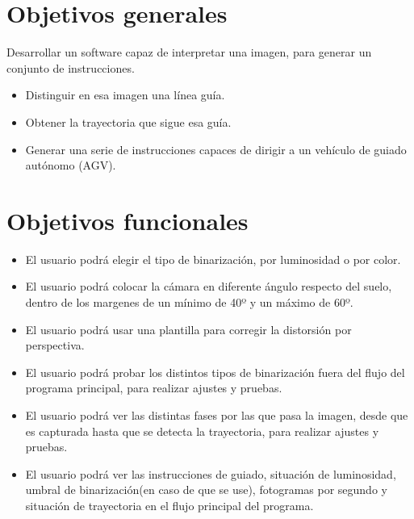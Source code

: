 
\section{Objetivos generales}
Desarrollar un software capaz de interpretar una imagen, para generar un conjunto de instrucciones.

\begin{itemize}
	\item Distinguir en esa imagen una línea guía.
	
	\item Obtener la trayectoria que sigue esa guía.
	
	\item Generar una serie de instrucciones capaces de dirigir a un vehículo de guiado autónomo (AGV).
\end{itemize} 

\section{Objetivos funcionales}
\begin{itemize}
	\item El usuario podrá elegir el tipo de binarización, por luminosidad o por color.
	
	\item El usuario podrá colocar la cámara en diferente ángulo respecto del suelo, dentro de los margenes de un mínimo de 40º y un máximo de 60º.
	
	\item El usuario podrá usar una plantilla para corregir la distorsión por perspectiva.
	
	\item El usuario podrá probar los distintos tipos de binarización fuera del flujo del programa principal, para realizar ajustes y pruebas.
	
	\item El usuario podrá ver las distintas fases por las que pasa la imagen, desde que es capturada hasta que se detecta la trayectoria, para realizar ajustes y pruebas.
	
	\item El usuario podrá ver las instrucciones de guiado, situación de luminosidad, umbral de binarización(en caso de que se use), fotogramas por segundo y situación de trayectoria en el flujo principal del programa.
	
\end{itemize}


